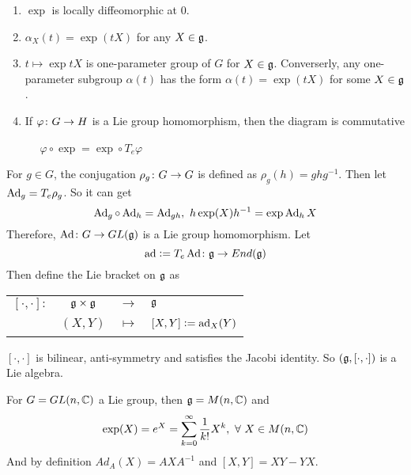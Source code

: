 \documentclass[a4paper,12pt]{article}
\begin{document}
	\begin{prop}
		\begin{enumerate}
			\item $\exp$ is locally diffeomorphic at $0$.
			\item $\alpha_{X}(t) = \exp(tX)$ for any $X \in \mathfrak{g}$.
			\item $t \mapsto \exp tX$ is one-parameter group of $G$ for $X\in \mathfrak{g}$. Converserly, any one-parameter subgroup $\alpha(t)$ has the form $\alpha(t) = \exp(tX)$ for some $X \in \mathfrak{g}$.
			\item If $\varphi \colon G \rightarrow H$ is a Lie group homomorphism, then the diagram is commutative
			\begin{center}
				~~ $\varphi \circ \exp = \exp \circ T_e \varphi$
			\end{center}
		\end{enumerate}
	\end{prop}
	For $g \in G$, the conjugation $\rho_g \colon G \rightarrow G$ is defined as $\rho_g(h) = ghg^{-1}$. Then let $\operatorname{Ad}_g = T_e\rho_g$. So it can get
	\begin{equation*}
		\operatorname{Ad}_{g} \circ \operatorname{Ad}_{h} = \operatorname{Ad}_{gh},~ h \exp(X) h^{-1} = \exp{\operatorname{Ad}_{h}X}
	\end{equation*}
	Therefore, $\operatorname{Ad} \colon G \rightarrow GL(\mathfrak{g})$ is a Lie group homomorphism. Let
	\begin{equation*}
		\operatorname{ad} \vcentcolon= T_e\operatorname{Ad} \colon \mathfrak{g} \rightarrow End(\mathfrak{g})
	\end{equation*}
	Then define the Lie bracket on $\mathfrak{g}$ as
	\begin{center}
		\begin{tabular}{l c c l}
			$[\cdot,\cdot] \colon$ & $\mathfrak{g} \times \mathfrak{g}$ & $\longrightarrow$ & $\mathfrak{g}$ \\
			~ & $(X,Y)$ & $\longmapsto$ & $[X,Y] \vcentcolon= \operatorname{ad}_{X}(Y)$
		\end{tabular}
	\end{center}
	$[\cdot,\cdot]$ is bilinear, anti-symmetry and satisfies the Jacobi identity. So $(\mathfrak{g},[\cdot,\cdot])$ is a Lie algebra.
	\begin{exam}
		For $G = GL(n,\mathbb{C})$ a Lie group, then $\mathfrak{g} = M(n,\mathbb{C})$ and
		\begin{equation*}
			\exp(X) = e^X = \sum_{k=0}^{\infty}\frac{1}{k!}X^k,~\forall~X \in M(n,\mathbb{C})
		\end{equation*}
		And by definition $Ad_A(X) = AXA^{-1}$ and $[X,Y] = XY - YX$.
	\end{exam}
\end{document}
